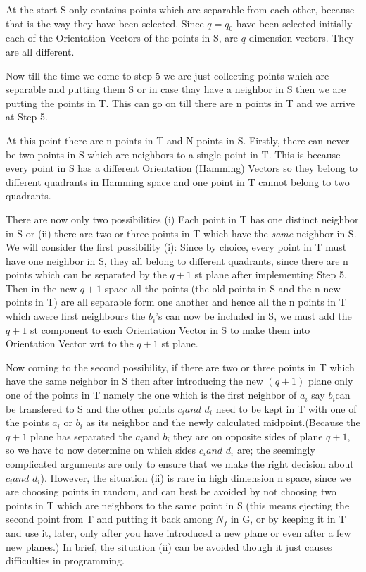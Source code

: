 \documentclass[english]{article}
\begin{document}
At the start S only contains points which are separable from each
other, because that is the way they have been selected. Since $q=q_{0}$
have been selected initially each of the Orientation Vectors of the
points in S, are $q$ dimension vectors. They are all different.

Now till the time we come to step 5 we are just collecting points
which are separable and putting them S or in case thay have a neighbor
in S then we are putting the points in T. This can go on till there
are n points in T and we arrive at Step 5.

At this point there are n points in T and N points in S. Firstly,
there can never be two points in S which are neighbors to a single
point in T. This is because every point in S has a different Orientation
(Hamming) Vectors so they belong to different quadrants in Hamming
space and one point in T cannot belong to two quadrants.

There are now only two possibilities (i) Each point in T has one distinct
neighbor in S or (ii) there are two or three points in T which have
the \textit{same} neighbor in S. We will consider the first possibility
(i): Since by choice, every point in T must have one neighbor in S,
they all belong to different quadrants, since there are n points which
can be separated by the $q+1$ st plane after implementing Step 5.
Then in the new $q+1$ space all the points (the old points in S and
the n new points in T) are all separable form one another and hence
all the n points in T which awere first neighbours the $b_{i}$'s
can now be included in S, we must add the $q+1$ st component to each
Orientation Vector in S to make them into Orientation Vector wrt to
the $q+1$ st plane.

Now coming to the second possibility, if there are two or three points
in T which have the same neighbor in S then after introducing the
new $(q+1)$ plane only one of the points in T namely the one which
is the first neighbor of $a_{i}$ say $b_{i}$can be transfered to
S and the other points $c_{i}and$ $d_{i}$ need to be kept in T with
one of the points $a_{i}$ or $b_{i}$ as its neighbor and the newly
calculated midpoint.(Because the $q+1$ plane has separated the $a_{i}$and
$b_{i}$ they are on opposite sides of plane $q+1$, so we have to
now determine on which sides $c_{i}and$ $d_{i}$ are; the seemingly
complicated arguments are only to ensure that we make the right decision
about $c_{i}and$ $d_{i}$). However, the situation (ii) is rare in
high dimension n space, since we are choosing points in random, and
can best be avoided by not choosing two points in T which are neighbors
to the same point in S (this means ejecting the second point from
T and putting it back among $N_{f}$ in G, or by keeping it in T and
use it, later, only after you have introduced a new plane or even
after a few new planes.) In brief, the situation (ii) can be avoided
though it just causes difficulties in programming.
\end{document}
